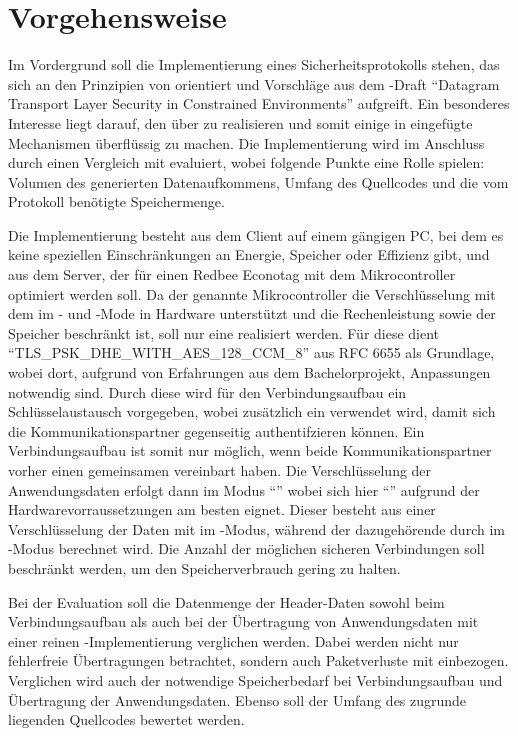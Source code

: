 \section{Vorgehensweise}

Im Vordergrund soll die Implementierung eines Sicherheitsprotokolls stehen, das sich an den Prinzipien von  orientiert
und Vorschläge aus dem -Draft "`Datagram Transport Layer Security in Constrained Environments"' \cite{draftcodtls} aufgreift.
Ein besonderes Interesse liegt darauf, den  über  \cite{draftcoap13} zu realisieren und somit einige in  eingefügte
Mechanismen überflüssig zu machen. Die Implementierung wird im Anschluss durch einen Vergleich mit  evaluiert, wobei folgende Punkte eine
Rolle spielen: Volumen des generierten Datenaufkommens, Umfang des Quellcodes und die vom Protokoll benötigte Speichermenge.

Die Implementierung besteht aus dem Client auf einem gängigen PC, bei dem es keine speziellen Einschränkungen an Energie,
Speicher oder Effizienz gibt, und aus dem Server, der für einen Redbee Econotag \cite{econotag} mit dem  \cite{mc1322}
Mikrocontroller optimiert werden soll. Da der genannte Mikrocontroller die Verschlüsselung mit dem  im - und -Mode
in Hardware unterstützt und die Rechenleistung sowie der Speicher beschränkt ist, soll nur eine  realisiert werden.
Für diese dient "`TLS\_PSK\_DHE\_WITH\_AES\_128\_CCM\_8"' aus RFC 6655 \cite{rfc6655} als Grundlage, wobei dort, aufgrund von Erfahrungen
aus dem Bachelorprojekt, Anpassungen notwendig sind. Durch diese wird für den Verbindungsaufbau ein Schlüsselaustausch vorgegeben, wobei zusätzlich
ein  verwendet wird, damit sich die Kommunikationspartner gegenseitig authentifzieren können. Ein Verbindungsaufbau ist somit nur möglich,
wenn beide Kommunikationspartner vorher einen gemeinsamen  vereinbart haben. Die Verschlüsselung der Anwendungsdaten erfolgt dann im Modus
"`"' \cite{rfc5116} wobei sich hier "`"' \cite{rfc3610} aufgrund der Hardwarevorraussetzungen am besten eignet. Dieser besteht
aus einer Verschlüsselung der Daten mit  im -Modus, während der dazugehörende  durch  im -Modus
berechnet wird. Die Anzahl der möglichen sicheren Verbindungen soll beschränkt werden, um den Speicherverbrauch gering zu halten.

Bei der Evaluation soll die Datenmenge der Header-Daten sowohl beim Verbindungsaufbau als auch bei der Übertragung von Anwendungsdaten
mit einer reinen -Implementierung verglichen werden. Dabei werden nicht nur fehlerfreie Übertragungen betrachtet, sondern auch Paketverluste
mit einbezogen. Verglichen wird auch der notwendige Speicherbedarf bei Verbindungsaufbau und Übertragung der Anwendungsdaten.
Ebenso soll der Umfang des zugrunde liegenden Quellcodes bewertet werden.